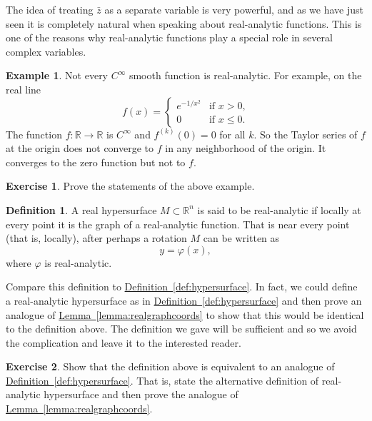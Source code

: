 \documentclass[12pt,openany]{book}
\newcommand{\R}{{\mathbb{R}}}
\theoremstyle{plain}
\theoremstyle{remark}
\theoremstyle{definition}
\newtheorem{defn}[thm]{Definition}
\newenvironment{exbox}{%
    \def\FrameCommand{\vrule width 1pt \relax\hspace {10pt}}%
    \MakeFramed {\advance \hsize -\width \FrameRestore }%
}{%
    \endMakeFramed
}
\theoremstyle{exercise}
\newtheorem{exercise}{Exercise}[section]
\theoremstyle{example}
\newtheorem{example}[thm]{Example}
\newcommand{\lemmaref}[1]{\hyperref[#1]{Lemma~\ref*{#1}}}
\newcommand{\defnref}[1]{\hyperref[#1]{Definition~\ref*{#1}}}
\begin{document}
The idea of treating $\bar{z}$ as a separate variable is very powerful, and
as we have just seen it is completely natural when speaking about
real-analytic functions.  This is one of the reasons why real-analytic
functions play a special role in several complex variables.

\begin{example}
Not every $C^\infty$ smooth function is real-analytic.  For example,
on the real line
\begin{equation*}
f(x) =
\begin{cases}
e^{-1/x^2} & \text{if $x > 0$,} \\
0 & \text{if $x \leq 0$.}
\end{cases}
\end{equation*}
The function
$f \colon \R \to \R$ is $C^\infty$ and $f^{(k)}(0) = 0$ for all $k$.
So the Taylor series of $f$ at the origin does
not converge to $f$ in any neighborhood of the origin.  It converges to the
zero function but not to $f$.
\end{example}

\begin{exbox}
\begin{exercise}
Prove the statements of the above example.
\end{exercise}
\end{exbox}

\begin{defn}
A real hypersurface $M \subset \R^n$ is said to be real-analytic
if locally at every point it is the graph of a real-analytic function.  That
is near every point (that is, locally), after perhaps a rotation $M$ can be written as
\begin{equation*}
y = \varphi(x) ,
\end{equation*}
where $\varphi$ is real-analytic.
\end{defn}

Compare this definition to \defnref{def:hypersurface}.  In fact, we could
define a real-analytic hypersurface as in 
\defnref{def:hypersurface} and then prove an analogue of
\lemmaref{lemma:realgraphcoords} to show that this would be identical to the
definition above.  The definition we gave will be sufficient and so we avoid
the complication and leave it to the interested reader.

\begin{exbox}
\begin{exercise}
Show that the definition above is equivalent to an analogue of
\defnref{def:hypersurface}.  That is, state the alternative definition of
real-analytic hypersurface and then prove the analogue of 
\lemmaref{lemma:realgraphcoords}.
\end{exercise}
\end{exbox}
\end{document}
